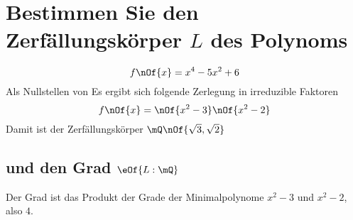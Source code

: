 \section{Bestimmen Sie den Zerfällungskörper $L$ des Polynoms}
\begin{equation}
	f\nOf{x} = x^4 - 5 x^2 + 6
\end{equation}
Als Nullstellen von
Es ergibt sich folgende Zerlegung in irreduzible Faktoren
\begin{equation}
	f\nOf{x} = \nOf{x^2-3}\nOf{x^2-2}
\end{equation}
Damit ist der Zerfällungskörper $\mQ\nOf{\sqrt{3},\sqrt{2}}$ 

\subsection{und den Grad $\eOf{L:\mQ}$}
Der Grad ist das Produkt der Grade der Minimalpolynome $x^2 - 3$ und $x^2-2$, also $4$.